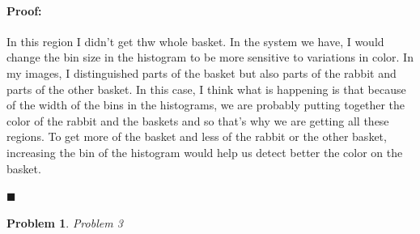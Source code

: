 \documentclass[12pt]{article}
\newenvironment{proof}{\paragraph{Proof: }}{\hfill$\blacksquare$}
\newtheorem{problem}{Problem}%
\begin{document}
\begin{proof}
\begin{enumerate}
\begin{enumerate}
In this region I didn't get thw whole basket. In the system we have, I would change the bin size in the histogram to be more sensitive to variations in color. In my images, I distinguished parts of the basket but also parts of the rabbit and parts of the other basket. In this case, I think what is happening is that because of the width of the bins in the histograms, we are probably putting together the color of the rabbit and the baskets and so that's why we are getting all these regions. To get more of the basket and less of the rabbit or the other basket, increasing the bin of the histogram would help us detect better the color on the basket. 

\end{enumerate}

\end{enumerate}
\end{proof}


\begin{problem}
\normalfont
Problem 3
\end{problem}
\end{document}
